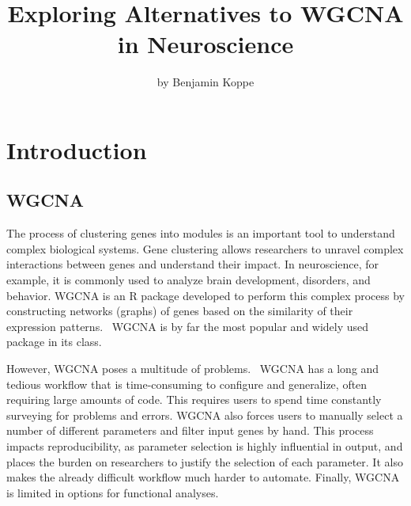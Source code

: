 \title{Exploring Alternatives to WGCNA in Neuroscience}
\author{by Benjamin Koppe}

\maketitle



\section{Introduction}

\subsection{WGCNA}
\label{subsec: WGCNA}
The process of clustering genes into modules is an important tool to understand complex biological systems. Gene clustering allows researchers to unravel complex interactions between genes and understand their impact. In neuroscience, for example, it is commonly used to analyze brain development, disorders, and behavior. WGCNA is an R package developed to perform this complex process by constructing networks (graphs) of genes based on the similarity of their expression patterns.~\cite{wgcna} WGCNA is by far the most popular and widely used package in its class.

However, WGCNA poses a multitude of problems.~\cite{cem} WGCNA has a long and tedious workflow that is time-consuming to configure and generalize, often requiring large amounts of code. This requires users to spend time constantly surveying for problems and errors. WGCNA also forces users to manually select a number of different parameters and filter input genes by hand. This process impacts reproducibility, as parameter selection is highly influential in output, and places the burden on researchers to justify the selection of each parameter. It also makes the already difficult workflow much harder to automate. Finally, WGCNA is limited in options for functional analyses.

